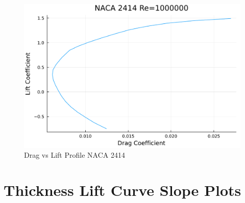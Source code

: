 \documentclass{article}
\begin{document}
\begin{figure}[h]
\begin{minipage}[b]{0.32\textwidth}
\includegraphics[width=\textwidth]{NACA 2414 Re=1000000_Drag_vs_Lift_Coefficent_Plot.pdf}
\caption{\label{fig:NACA 2414 Drag Lift}Drag vs Lift Profile NACA 2414}
\end{minipage}
\end{figure}

\clearpage

\section{Thickness Lift Curve Slope Plots}
\label{sec:third_appendix}
\end{document}
